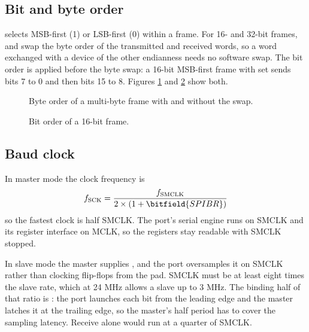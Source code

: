 \subsection{Bit and byte order}

 selects MSB-first (1) or LSB-first (0) within a frame. For 16- and 32-bit frames,  and  swap the byte order of the transmitted and received words, so a word exchanged with a device of the other endianness needs no software swap. The bit order is applied before the byte swap: a 16-bit MSB-first frame with  set sends bits 7 to 0 and then bits 15 to 8. Figures \ref{fig:spi-byte-ordering} and \ref{fig:spi-bit-ordering} show both.

\begin{figure}[htpb]
	
	\caption{Byte order of a multi-byte frame with and without the swap.}
	\label{fig:spi-byte-ordering}
\end{figure}

\begin{figure}[htpb]
	
	\caption{Bit order of a 16-bit frame.}
	\label{fig:spi-bit-ordering}
\end{figure}

\subsection{Baud clock}

In master mode the clock frequency is
\begin{equation*}
f_\textrm{SCK} = \frac{f_\textrm{SMCLK}}{2 \times (1 + \bitfield{SPIBR})}
\end{equation*}
so the fastest clock is half SMCLK. The port's serial engine runs on SMCLK and its register interface on MCLK, so the registers stay readable with SMCLK stopped.

In slave mode the master supplies , and the port oversamples it on SMCLK rather than clocking flip-flops from the pad. SMCLK must be at least eight times the slave  rate, which at 24 MHz allows a slave  up to 3 MHz. The binding half of that ratio is : the port launches each bit from the leading  edge and the master latches it at the trailing edge, so the master's half period has to cover the sampling latency. Receive alone would run at a quarter of SMCLK.

